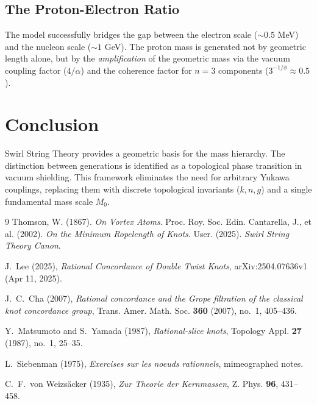 \documentclass[11pt, a4paper]{article}
\begin{document}
\subsection{The Proton-Electron Ratio}
The model successfully bridges the gap between the electron scale ($\sim 0.5$ MeV) and the nucleon scale ($\sim 1$ GeV). The proton mass is generated not by geometric length alone, but by the \textit{amplification} of the geometric mass via the vacuum coupling factor ($4/\alpha$) and the coherence factor for $n=3$ components ($3^{-1/\phi} \approx 0.5$).

\section{Conclusion}
Swirl String Theory provides a geometric basis for the mass hierarchy. The distinction between generations is identified as a topological phase transition in vacuum shielding. This framework eliminates the need for arbitrary Yukawa couplings, replacing them with discrete topological invariants ($k, n, g$) and a single fundamental mass scale $M_0$.

\begin{thebibliography}{9}
 Thomson, W. (1867). \textit{On Vortex Atoms}. Proc. Roy. Soc. Edin.
 Cantarella, J., et al. (2002). \textit{On the Minimum Ropelength of Knots}.
 User. (2025). \textit{Swirl String Theory Canon}.

J.~Lee (2025),
\textit{Rational Concordance of Double Twist Knots},
arXiv:2504.07636v1 (Apr 11, 2025).

J.~C.~Cha (2007),
\textit{Rational concordance and the Grope filtration of the classical knot concordance group},
Trans. Amer. Math. Soc. \textbf{360} (2007), no.~1, 405--436.

Y.~Matsumoto and S.~Yamada (1987),
\textit{Rational-slice knots},
Topology Appl. \textbf{27} (1987), no.~1, 25--35.

L.~Siebenman (1975),
\textit{Exercises sur les noeuds rationnels},
mimeographed notes.

C.~F.~von Weizs\"acker (1935),
\textit{Zur Theorie der Kernmassen},
Z. Phys. \textbf{96}, 431--458.
\end{thebibliography}
\end{document}
